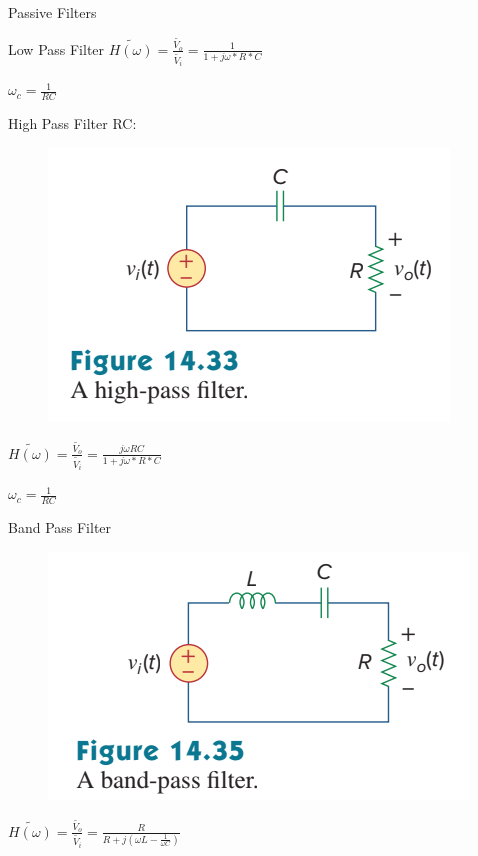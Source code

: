\documentclass[11pt]{article}
\begin{document}
\begin{section}{Passive Filters}
\begin{subsection}{Low Pass Filter}
$\tilde{H(\omega)} = \frac{\tilde{V_o}}{\tilde{V_i}} = \frac{1}{1+ j \omega * R * C} $

$\omega_c = \frac{1}{RC}$

\end{subsection}

\begin{subsection}{High Pass Filter}
RC:

\begin{figure}
	 \includegraphics[bb=0 0 30 30]{HPF_RC.png}
 \end{figure}

 $\tilde{H(\omega)} = \frac{\tilde{V_o}}{\tilde{V_i}} = \frac{j \omega R C}{1+ j \omega * R * C} $

 $\omega_c = \frac{1}{RC}$

\end{subsection}

\begin{subsection}{Band Pass Filter}

\begin{figure}
	\includegraphics[bb=0 0 30 30]{BPF_RLC.png}
\end{figure}

$\tilde{H(\omega)} = \frac{\tilde{V_o}}{\tilde{V_i}} = \frac{ R }{R+ j (\omega L - \frac{1}{\omega C})} $


\end{subsection}
\end{section}
\end{document}
